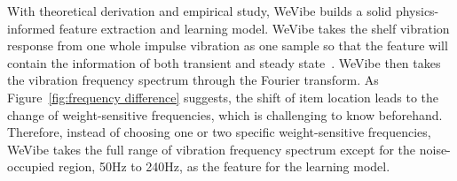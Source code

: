 With theoretical derivation and empirical study, WeVibe builds a solid physics-informed feature extraction and learning model. WeVibe takes the shelf vibration response from one whole impulse vibration as one sample so that the feature will contain the information of both transient and steady state~\cite{huang2020vibration}. WeVibe then takes the vibration frequency spectrum through the Fourier transform. As Figure~\ref{fig:frequency difference} suggests, the shift of item location leads to the change of weight-sensitive frequencies, which is challenging to know beforehand. Therefore, instead of choosing one or two specific weight-sensitive frequencies, WeVibe takes the full range of vibration frequency spectrum except for the noise-occupied region, 50Hz to 240Hz, as the feature for the learning model.







